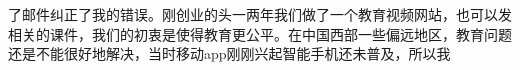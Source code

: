 \documentclass[12pt,twiside,a4paper]{ctexbook}
\numberwithin{chapter}{part}
\begin{document}
了邮件纠正了我的错误。刚创业的头一两年我们做了一个教育视频网站，也可以发相关的课件，我们的初衷是使得教育更公平。在中国西部一些偏远地区，教育问题还是不能很好地解决，当时移动app刚刚兴起智能手机还未普及，所以我
\end{document}
